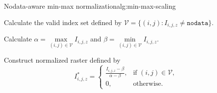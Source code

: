 \begin{algorithm}{Nodata-aware min-max normalization}{alg:min-max-scaling}
  \item Calculate the valid index set defined by $\mathcal{V} = \{(i, j): I_{i,j,z} \neq \texttt{nodata}\}$.
  \item Calculate $\alpha = \underset{(i,j) \in \mathcal{V}}{\max} I_{i,j,z}$ and $\beta = \underset{(i,j) \in \mathcal{V}}{\min} I_{i,j,z}$.
  \item Construct normalized raster defined by
    \begin{equation*}
        I_{i,j,z}^* = \begin{cases}
          \frac{I_{i,j,z} - \beta}{\alpha - \beta}, & \text{if } (i,j) \in \mathcal{V}, \\
          0, & \text{otherwise.}
        \end{cases}
    \end{equation*}
\end{algorithm}
